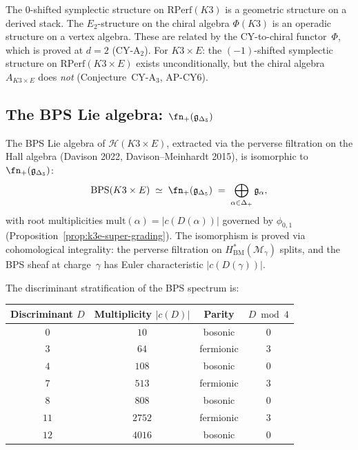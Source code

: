 \begin{warning}
\label{warn:k3e-rperf-vs-chiral}
The $0$-shifted symplectic structure on $\mathrm{RPerf}(K3)$ is a geometric structure on a derived stack.  The $E_2$-structure on the chiral algebra $\Phi(K3)$ is an operadic structure on a vertex algebra.  These are related by the CY-to-chiral functor~$\Phi$, which is proved at $d=2$ (CY-A$_2$).  For $K3 \times E$: the $(-1)$-shifted symplectic structure on $\mathrm{RPerf}(K3 \times E)$ exists unconditionally, but the chiral algebra $A_{K3 \times E}$ does \emph{not} (Conjecture~CY-A$_3$, AP-CY6).
\end{warning}

\subsection{The BPS Lie algebra: $\fn_+(\mathfrak{g}_{\Delta_5})$}
\label{subsec:k3e-bps-lie-algebra}

\begin{theorem}
\label{thm:k3e-bps-lie}
\ClaimStatusProvedElsewhere
The BPS Lie algebra of $\mathcal{H}(K3 \times E)$, extracted via the perverse filtration on the Hall algebra \textup{(Davison 2022, Davison--Meinhardt 2015)}, is isomorphic to $\fn_+(\mathfrak{g}_{\Delta_5})$:
\[
  \mathrm{BPS}(K3 \times E)
  \;\simeq\;
  \fn_+(\mathfrak{g}_{\Delta_5})
  \;=\;
  \bigoplus_{\alpha \in \Delta_+} \mathfrak{g}_\alpha,
\]
with root multiplicities $\mathrm{mult}(\alpha) = |c(D(\alpha))|$ governed by $\phi_{0,1}$ (Proposition~\ref{prop:k3e-super-grading}).  The isomorphism is proved via cohomological integrality: the perverse filtration on $H^*_{\mathrm{BM}}(\mathcal{M}_\gamma)$ splits, and the BPS sheaf at charge~$\gamma$ has Euler characteristic $|c(D(\gamma))|$.
\end{theorem}

The discriminant stratification of the BPS spectrum is:

\begin{center}
\renewcommand{\arraystretch}{1.3}
\begin{tabular}{c|ccc}
\textbf{Discriminant $D$} & \textbf{Multiplicity $|c(D)|$} & \textbf{Parity} & \textbf{$D \bmod 4$} \\ \hline
$0$  & $10$ & bosonic & $0$ \\
$3$  & $64$ & fermionic & $3$ \\
$4$  & $108$ & bosonic & $0$ \\
$7$  & $513$ & fermionic & $3$ \\
$8$  & $808$ & bosonic & $0$ \\
$11$ & $2752$ & fermionic & $3$ \\
$12$ & $4016$ & bosonic & $0$
\end{tabular}
\end{center}

